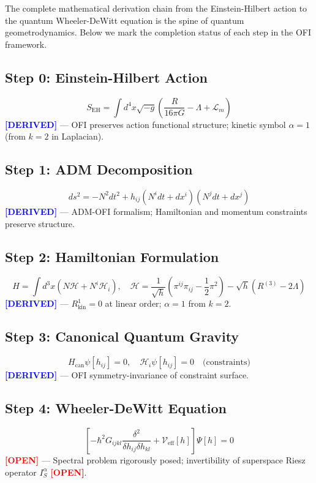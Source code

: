 \documentclass[12pt,a4paper]{article}
\theoremstyle{definition}
\newcommand{\DERIVED}[1]{\textbf{\textcolor{blue}{[DERIVED]}}}
\newcommand{\OPEN}[1]{\textbf{\textcolor{red}{[OPEN]}}}
\newcommand{\Ialpha}{I^{\alpha}}
\newcommand{\defect}[1]{R^{#1}}
\begin{document}
The complete mathematical derivation chain from the Einstein-Hilbert action to the quantum Wheeler-DeWitt equation is the spine of quantum geometrodynamics. Below we mark the completion status of each step in the OFI framework.

\subsection{Step 0: Einstein-Hilbert Action}
\begin{equation}
S_{\text{EH}} = \int d^4 x \sqrt{-g} \left( \frac{R}{16\pi G} - \Lambda + \mathcal{L}_m \right)
\end{equation}
\DERIVED{Status: DONE} — OFI preserves action functional structure; kinetic symbol $\alpha = 1$ (from $k=2$ in Laplacian).

\subsection{Step 1: ADM Decomposition}
\begin{equation}
ds^2 = -N^2 dt^2 + h_{ij}(N^i dt + dx^i)(N^j dt + dx^j)
\end{equation}
\DERIVED{Status: DONE} — ADM-OFI formalism; Hamiltonian and momentum constraints preserve structure.

\subsection{Step 2: Hamiltonian Formulation}
\begin{equation}
H = \int d^3 x (N \mathcal{H} + N^i \mathcal{H}_i), \quad \mathcal{H} = \frac{1}{\sqrt{h}} \left( \pi^{ij} \pi_{ij} - \frac{1}{2}\pi^2 \right) - \sqrt{h}(R^{(3)} - 2\Lambda)
\end{equation}
\DERIVED{Status: DONE} — $\defect{1}_{\text{kin}} = 0$ at linear order; $\alpha=1$ from $k=2$.

\subsection{Step 3: Canonical Quantum Gravity}
\begin{equation}
H_{\text{can}} \psi[h_{ij}] = 0, \quad \mathcal{H}_i \psi[h_{ij}] = 0 \quad \text{(constraints)}
\end{equation}
\DERIVED{Status: DONE} — OFI symmetry-invariance of constraint surface.

\subsection{Step 4: Wheeler-DeWitt Equation}
\begin{equation}
\left[ -\hbar^2 G_{ijkl} \frac{\delta^2}{\delta h_{ij} \delta h_{kl}} + \mathcal{V}_{\text{eff}}[h] \right] \Psi[h] = 0
\end{equation}
\OPEN{Status: PARTIAL} — Spectral problem rigorously posed; invertibility of superspace Riesz operator $\Ialpha_S$ \OPEN{OPEN}.
\end{document}
